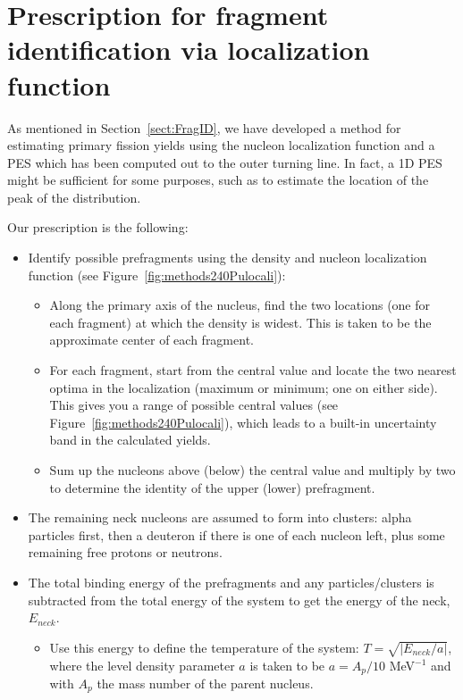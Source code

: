 \chapter{Prescription for fragment identification via localization function}\label{append:Fragments}
As mentioned in Section~\ref{sect:FragID}, we have developed a method for estimating primary fission yields using the nucleon localization function and a PES which has been computed out to the outer turning line. In fact, a 1D PES might be sufficient for some purposes, such as to estimate the location of the peak of the distribution.

Our prescription is the following:

\begin{itemize}
	\item Identify possible prefragments using the density and nucleon localization function (see Figure~\ref{fig:methods240Pulocali}):
	\begin{itemize}
		\item Along the primary axis of the nucleus, find the two locations (one for each fragment) at which the density is widest. This is taken to be the approximate center of each fragment.
		\item For each fragment, start from the central value and locate the two nearest optima in the localization (maximum or minimum; one on either side). This gives you a range of possible central values (see Figure~\ref{fig:methods240Pulocali}), which leads to a built-in uncertainty band in the calculated yields.
		\item Sum up the nucleons above (below) the central value and multiply by two to determine the identity of the upper (lower) prefragment.
	\end{itemize}
	\item The remaining neck nucleons are assumed to form into clusters: alpha particles first, then a deuteron if there is one of each nucleon left, plus some remaining free protons or neutrons.
	\item The total binding energy of the prefragments and any particles/clusters is subtracted from the total energy of the system to get the energy of the neck, $E_{neck}$.
	\begin{itemize}
		\item Use this energy to define the temperature of the system: $T = \sqrt{\left|E_{neck}/a\right|}$, where the level density parameter $a$ is taken to be $a=A_p/10$ MeV$^{-1}$ and with $A_p$ the mass number of the parent nucleus.
	\end{itemize}

\end{itemize}
